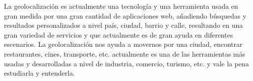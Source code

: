     La geolocalizaci\'on es actualmente una tecnolog\'ia y una herramienta usada en gran medida por una gran cantidad de aplicaciones web, a\~nadiendo b\'usquedas y resultados personalizados a nivel pa\'is, ciudad, barrio y calle, resultando en una gran variedad de servicios y que actualmente es de gran ayuda en diferentes escenarios. La geolocalizaci\'on nos ayuda a movernos por una ciudad, encontrar restaurantes, cines, transporte, etc. actualmente es una de las herramientas m\'as usadas y desarrolladas a nivel de industria, comercio, turismo, etc. y vale la pena estudiarla y entenderla.\\








